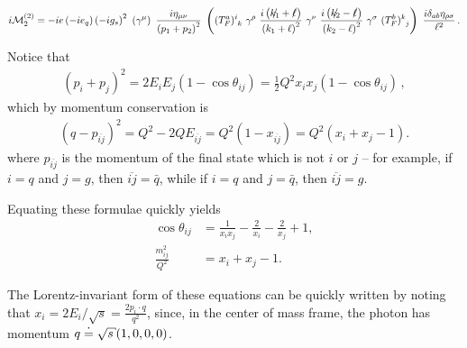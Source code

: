 \begin{align}
    i \mathcal{M}_2^{(2)}
    =
    -i e
    \le(-i e_q\ri)
    \le(-i g_s\ri)^2
    \,\,
    \le(
    \gamma^\mu
    \ri)
    \,\,
    \frac{i \eta_{\mu\nu}}{\le(p_1 + p_2\ri)^2}
    \,\,
    \le(
        (T_F^a)\indices{^i_k}
        \,\,
        \gamma^\rho
        \,\,
        \frac{i \le(\slashed{k_1} + \slashed{\ell}\ri)}
            {\le(k_1 + \ell\ri)^2}
        \,\,
        \gamma^\nu
        \,\,
        \frac{i \le(\slashed{k_2} - \slashed{\ell}\ri)}
            {\le(k_2 - \ell\ri)^2}
        \,\,
        \gamma^\sigma
        \,\,
        (T_F^b)\indices{^k_j}
    \ri)
    \,\,
    \frac{i \delta_{ab} \eta_{\rho\sigma}}{\ell^2}
    \,.
\end{align}



Notice that
\begin{align}
    (p_i + p_j)^2 = 2 E_i E_j (1 - \cos\theta_{ij}) = \frac{1}{2}Q^2 x_i x_j (1 - \cos\theta_{ij})
    \,,
\end{align}
which by momentum conservation is
\begin{align}
    (q - p_{\overline{ij}})^2 = Q^2 - 2 Q E_{\overline{ij}} = Q^2(1 - x_{\overline{ij}}) = Q^2(x_i + x_j - 1).
\end{align}
where \(p_{\overline{ij}}\) is the momentum of the final state which is not \(i\) or \(j\)
%
--
%
for example, if \(i=q\) and \(j = g\), then \(\overline{ij} = \bar{q}\), while if \(i=q\) and \(j = \bar{q}\), then \(\overline{ij} = g\).

Equating these formulae quickly yields
\begin{align}
    \cos\theta_{ij} &= \frac{1}{x_i x_j} - \frac{2}{x_i} - \frac{2}{x_j} + 1
    ,
    \\
    \frac{m^2_{ij}}{Q^2} &= x_i + x_j - 1
    .
\end{align}

The Lorentz-invariant form of these equations can be quickly written by noting that \(x_i = 2 E_i/\sqrt{s} = \frac{2 p_i\cdot q}{q^2}\), since, in the center of mass frame, the photon has momentum \(q \reppedby \sqrt{s}(1,0,0,0)\).




